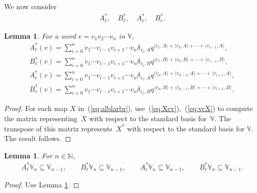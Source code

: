 \documentclass[11pt]{article}
\numberwithin{equation}{section}
\numberwithin{equation}{section}
\newtheorem{Lemma}[Theorem]{Lemma}
\begin{document}
{We now consider
\begin{gather}\label{eq:AlBl}
A^*_\ell, \quad B^*_\ell, \quad A^*_r,\quad B^*_r.
\end{gather}

\begin{Lemma}\label{lem:dualaction}For a word $v=v_1v_2\cdots v_n$ in $\mathbb V$,
\begin{gather*}
A^*_\ell(v) = \sum_{i=0}^n
 v_1 \cdots v_{i-1}
	 v_{i+1}\cdots v_n
	 \delta_{v_i,A}
	 q^{\langle v_1,A\rangle+ \langle v_2, A\rangle + \cdots +
	 \langle v_{i-1},A\rangle},
\\
B^*_\ell(v) = \sum_{i=0}^n
 v_1 \cdots v_{i-1}
	 v_{i+1}\cdots v_n
	 \delta_{v_i,B}
	 q^{\langle v_1,B\rangle+ \langle v_2, B\rangle + \cdots +
	 \langle v_{i-1},B\rangle},
\\
A^*_r(v) = \sum_{i=0}^n
 v_1 \cdots v_{i-1}
	 v_{i+1}\cdots v_n
	 \delta_{v_i,A}
	 q^{\langle v_n,A\rangle+ \langle v_{n-1}, A\rangle + \cdots +
	 \langle v_{i+1},A\rangle},
\\
B^*_r(v) = \sum_{i=0}^n
 v_1 \cdots v_{i-1}
	 v_{i+1}\cdots v_n
	 \delta_{v_i,B}
	 q^{\langle v_n,B\rangle+ \langle v_{n-1}, B\rangle + \cdots +
	 \langle v_{i+1},B\rangle}.
\end{gather*}
\end{Lemma}
\begin{proof} For each map $X$ in~(\ref{eq:alblarbr}), use~(\ref{eq:Xcv}),~(\ref{eq:vcX})
to compute the matrix representing~$X$
with respect to the standard basis for~$\mathbb V$.
The transpose of this matrix represents~$X^*$
with respect to the standard basis for $\mathbb V$.
The result follows.
\end{proof}

\begin{Lemma}\label{lem:ABLower2}
For $n \in \mathbb N$,
\begin{gather*}
A^*_{\ell} \mathbb V_n \subseteq \mathbb V_{n-1},
\qquad
B^*_{\ell} \mathbb V_n \subseteq \mathbb V_{n-1},
\qquad
A^*_{r} \mathbb V_n \subseteq \mathbb V_{n-1},
\qquad
B^*_{r} \mathbb V_n \subseteq \mathbb V_{n-1}.
\end{gather*}
\end{Lemma}
\begin{proof}Use
Lemma \ref{lem:dualaction}.
\end{proof}

}
\end{document}

